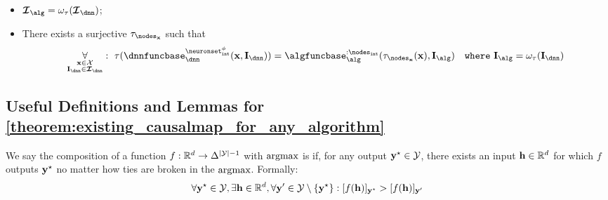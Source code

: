\begin{altdefinition}
\begin{itemize}
    \item $\interventionsset_{\alg} = \omega_\abstractionmap(\interventionsset_{\dnn})$;
    \item There exists a surjective $\abstractionmap_{\nodesinput}$ such that
    \begin{align}
        \myforall_{\substack{\bx\in\calX \\\interventionsdnn\in\interventionsset_{\dnn}}}:\  \abstractionmap(\dnnfunclayer{\neuronsetintcausal}(\bx,\interventionsdnn))=\algfuncnode{:\nodesint}(\abstractionmap_{\nodesinput}(\bx),\interventionsalg)\quad\mathtt{ where }\,\,\interventionsalg=\interventionmap(\interventionsdnn)
    \end{align}
\end{itemize}
\end{altdefinition}

\subsection{Useful Definitions and Lemmas for \texorpdfstring{\cref{theorem:existing_causalmap_for_any_algorithm}}{Theorem}}\label{appsubsec:main_theorem_lemmas}

\begin{definition}\label{defn:strict_surjectivity}
    We say the composition of a function $f: \mathbb{R}^d \to \Delta^{|\mathcal{Y}|-1}$ with $\operatorname*{argmax}$ is  if, for any output ${\mathbf{y}^{\star}} \in \mathcal{Y}$, there exists an input $\mathbf{h}\in \mathbb{R}^d$ for which $f$ outputs ${\mathbf{y}^{\star}}$ no matter how ties are broken in the $\operatorname*{argmax}$. 
    Formally:
    \begin{align}
        \forall {\mathbf{y}^{\star}} \in \mathcal{Y},\exists \mathbf{h}\in\mathbb{R}^{d},\forall \mathbf{y}'\in\mathcal{Y}\setminus\{{\mathbf{y}^{\star}}\}: [f(\mathbf{h})]_{{\mathbf{y}^{\star}}} > [f(\mathbf{h})]_{\mathbf{y}'}
    \end{align}
\end{definition}

